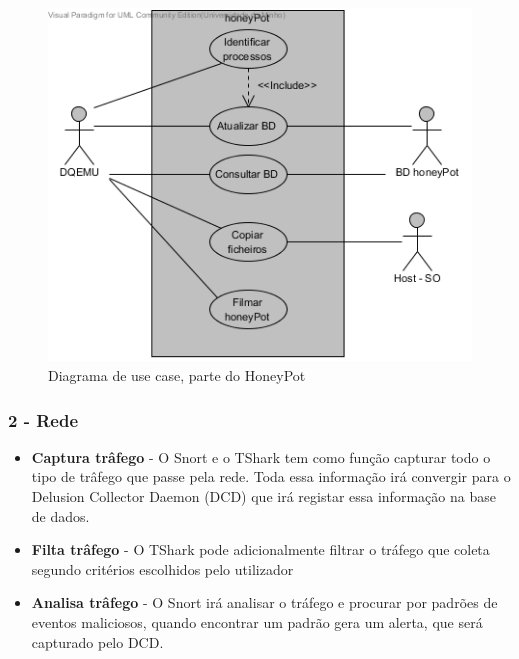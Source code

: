 \begin{figure}[!htb]
	\centering
	\includegraphics[scale=0.80]{images/ucs/HoneyPot}
	\caption {Diagrama de use case, parte do HoneyPot}
\end{figure}
\pagebreak


\subsubsection{\textbf{2 - Rede}}


\begin{itemize}
 \item \textbf{Captura trâfego} - O Snort e o TShark tem como função capturar todo o tipo de trâfego que passe pela rede. Toda essa informação
 irá convergir para o Delusion Collector Daemon (DCD) que irá registar essa informação na base de dados.
 \item \textbf{Filta trâfego} - O TShark pode adicionalmente filtrar o tráfego que coleta segundo critérios escolhidos pelo utilizador
 \item \textbf{Analisa trâfego} - O Snort irá analisar o tráfego e procurar por padrões de eventos maliciosos, quando encontrar um padrão gera um
 alerta, que será capturado pelo DCD.
 \end{itemize}



